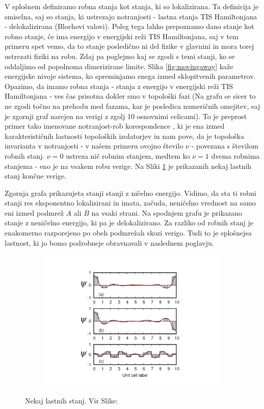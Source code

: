 V splošnem definiramo robna stanja kot stanja, ki so lokalizirana. Ta definicija je smiselna, saj so stanja, ki ustrezajo notranjosti - lastna stanja TIS Hamiltonjana - delokalizirana (Blochovi valovi). Poleg tega lahko prepoznamo dano stanje kot robno stanje, če ima energijo v energijski reži TIS Hamiltonjana, saj v tem primeru spet vemo, da to stanje posledično ni del fizike v glavnini in mora torej ustrezati fiziki na robu.
Zdaj pa poglejmo kaj se zgodi s temi stanji, ko se oddaljimo od popolnoma dimerizirane limite. Slika \ref{fig:movingaway} kaže energijske nivoje sistema, ko spreminjamo enega izmed sklopitvenih parametrov. Opazimo, da imamo robna stanja - stanja z energijo v energijski reži TIS Hamiltonjana - ves čas prisotna dokler smo v topološki fazi (Na grafu se sicer to ne zgodi točno na prehodu med fazama, kar je posledica numeričnih omejitev, saj je zgornji graf narejen na verigi z zgolj 10 osnovnimi celicami). To je preprost primer tako imenovane notranjost-rob korespondence \cite{proof}, ki je ena izmed karakterističnih lastnosti topoloških izolatorjev in nam pove, da je topološka invarianta v notranjosti - v našem primeru ovojno število $\nu$ - povezana s številom robnih stanj. $\nu = 0$ ustreza nič robnim stanjem, medtem ko $\nu = 1$ dvema robnima stanjema - eno je na vsakem robu verige.
Na Sliki \ref{fig:plots} je prikazanih nekaj lastnih stanj končne verige. 
\begin{multicols}{2}
Zgornja grafa prikazujeta stanji stanji z ničelno energijo. Vidimo, da sta ti robni stanji res eksponentno lokalizirani in imata, začuda, neničelno vrednost na samo eni izmed podmrež $A$ ali $B$ na vsaki strani. Na spodnjem grafu je prikazano stanje z neničelno energijo, ki pa je delokalizirano. Za razliko od robnih stanj je enakomerno razporejeno po obeh podmrežah skozi verigo. Tudi to je splošnejsa lastnost, ki jo bomo podrobneje obravnavali v naslednem poglavju.
\columnbreak
\begin{figure}[H]
\centering
\begin{subfigure}{.48\textwidth}
\includegraphics[width=\linewidth]{Figures/wave.pdf}
\end{subfigure}
\caption{Nekaj lastnih stanj. Vir Slike: \cite{arxiv}}
\label{fig:plots}
\end{figure}
\end{multicols}
